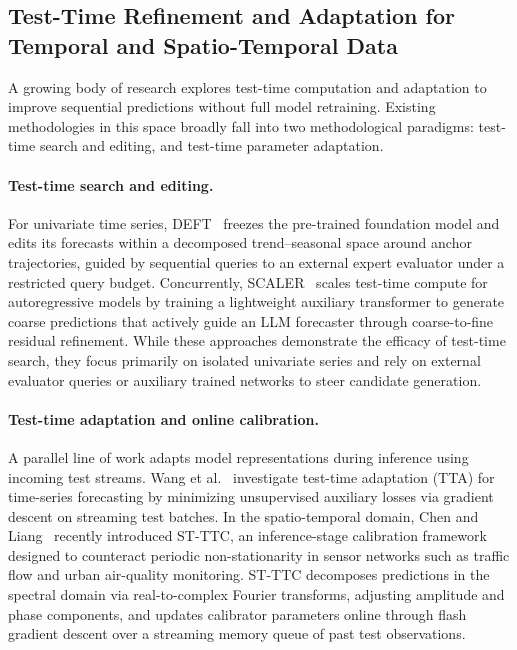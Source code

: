 \documentclass[preprint,12pt]{elsarticle}
\begin{document}
\subsection{Test-Time Refinement and Adaptation for Temporal and Spatio-Temporal Data}
A growing body of research explores test-time computation and adaptation to improve sequential predictions without full model retraining. Existing methodologies in this space broadly fall into two methodological paradigms: test-time search and editing, and test-time parameter adaptation.

\paragraph{Test-time search and editing.}
For univariate time series, DEFT~\citep{le2026deft} freezes the pre-trained foundation model and edits its forecasts within a decomposed trend--seasonal space around anchor trajectories, guided by sequential queries to an external expert evaluator under a restricted query budget. Concurrently, SCALER~\citep{le2026scaler} scales test-time compute for autoregressive models by training a lightweight auxiliary transformer to generate coarse predictions that actively guide an LLM forecaster through coarse-to-fine residual refinement. While these approaches demonstrate the efficacy of test-time search, they focus primarily on isolated univariate series and rely on external evaluator queries or auxiliary trained networks to steer candidate generation.

\paragraph{Test-time adaptation and online calibration.}
A parallel line of work adapts model representations during inference using incoming test streams. Wang et al.~\citep{wang2026tta} investigate test-time adaptation (TTA) for time-series forecasting by minimizing unsupervised auxiliary losses via gradient descent on streaming test batches. In the spatio-temporal domain, Chen and Liang~\citep{chen2025stttc} recently introduced ST-TTC, an inference-stage calibration framework designed to counteract periodic non-stationarity in sensor networks such as traffic flow and urban air-quality monitoring. ST-TTC decomposes predictions in the spectral domain via real-to-complex Fourier transforms, adjusting amplitude and phase components, and updates calibrator parameters online through flash gradient descent over a streaming memory queue of past test observations.
\end{document}
